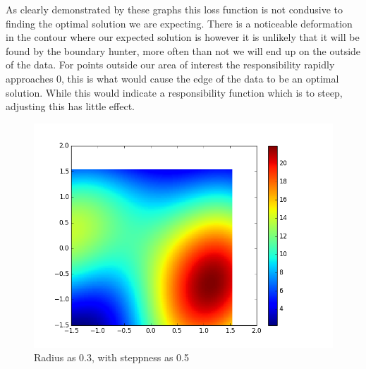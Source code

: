 \documentclass{article}
\begin{document}
As clearly demonstrated by these graphs this loss function is not condusive to finding the optimal solution we are expecting.  There is a noticeable deformation in the contour where our expected solution is however it is unlikely that it will be found by the boundary hunter, more often than not we will end up on the outside of the data. For points outside our area of interest the responsibility rapidly approaches 0, this is what would cause the edge of the data to be an optimal solution. While this would indicate a responsibility function which is to steep, adjusting this has little effect.

\begin{figure}[H]
  \centering
  \begin{minipage}[b]{0.8\textwidth}
    \includegraphics[width=\textwidth]{LossPlot-4.png}
    \caption{Radius as 0.3, with steppness as 0.5}
  \end{minipage}
  \hfill
\end{figure}
\end{document}
